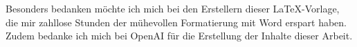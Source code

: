 Besonders bedanken möchte ich mich bei den Erstellern dieser LaTeX-Vorlage, die mir zahllose Stunden der mühevollen Formatierung mit Word erspart haben.
Zudem bedanke ich mich bei OpenAI für die Erstellung der Inhalte dieser Arbeit.

\newpage